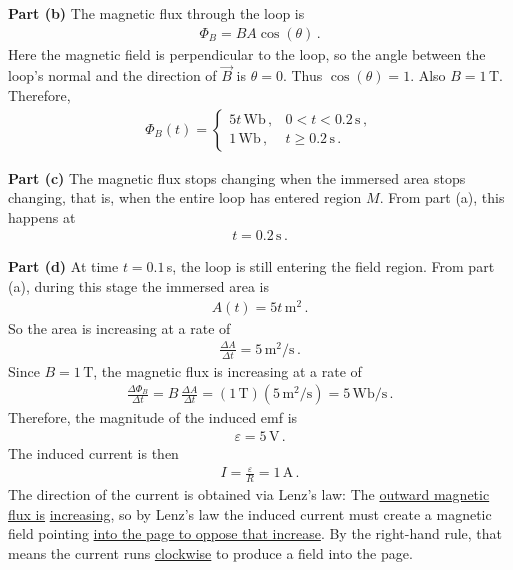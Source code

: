 \documentclass[11pt]{article}
\begin{document}
\noindent\textbf{Part (b)} The magnetic flux through the loop is
\begin{align*}
\Phi_B = BA\cos(\theta)\,.
\end{align*}
Here the magnetic field is perpendicular to the loop, so the angle between the loop's normal and the direction of $\vec{B}$ is $\theta=0$. Thus $\cos(\theta)=1$. Also $B=1\,$T. Therefore,
\begin{align*}
\Phi_B(t)=
\begin{cases}
5t\,\text{Wb}\,, & 0<t<0.2\,\text{s}\,,\\
1\,\text{Wb}\,, & t\ge 0.2\,\text{s}\,.
\end{cases}
\end{align*}

\noindent\textbf{Part (c)} The magnetic flux stops changing when the immersed area stops changing, that is, when the entire loop has entered region $M$. From part (a), this happens at
\begin{align*}
t = 0.2\,\text{s}\,.
\end{align*}

\noindent\textbf{Part (d)} At time $t=0.1\,$s, the loop is still entering the field region. From part (a), during this stage the immersed area is
\begin{align*}
A(t)=5t\,\text{m}^2\,.
\end{align*}
So the area is increasing at a rate of
\begin{align*}
\frac{\Delta A}{\Delta t}=5\,\text{m}^2/\text{s}\,.
\end{align*}
Since $B=1\,\text{T}$, the magnetic flux is increasing at a rate of
\begin{align*}
\frac{\Delta \Phi_B}{\Delta t}=B\,\frac{\Delta A}{\Delta t}=(1\,\text{T})(5\,\text{m}^2/\text{s})=5\,\text{Wb/s}\,.
\end{align*}
Therefore, the magnitude of the induced emf is
\begin{align*}
\varepsilon = 5\,\text{V}\,.
\end{align*}
The induced current is then
\begin{align*}
I = \frac{\varepsilon}{R} = 1\,\text{A}\,.
\end{align*}
The direction of the current is obtained via Lenz's law: The \underline{outward magnetic flux is} \underline{increasing}, so by Lenz's law the induced current must create a magnetic field pointing \underline{into the page to oppose that increase}. By the right-hand rule, that means the current runs \underline{clockwise} to produce a field into the page.\\
\end{document}
